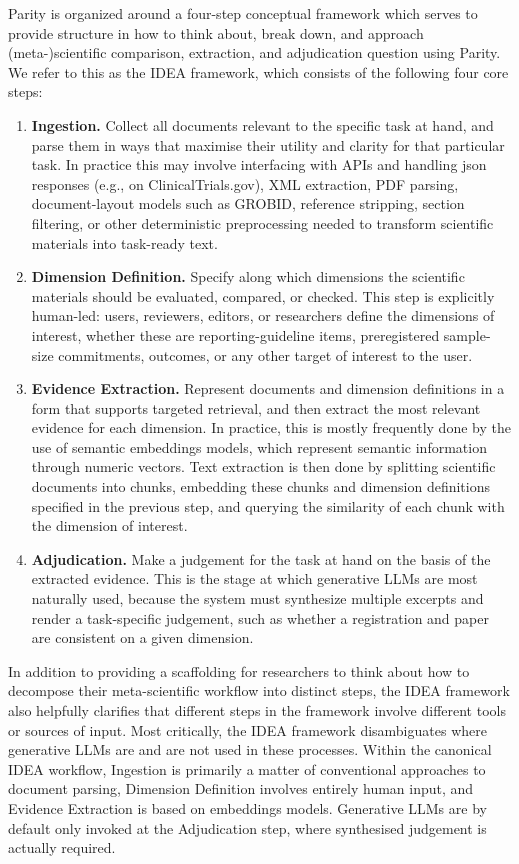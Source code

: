 \documentclass{article}
\begin{document}
Parity is organized around a four-step conceptual framework which serves to provide structure in how to think about, break down, and approach (meta-)scientific comparison, extraction, and adjudication question using Parity. We refer to this as the IDEA framework, which consists of the following four core steps:
\begin{enumerate}
\item \textbf{Ingestion.} Collect all documents relevant to the specific task at hand, and parse them in ways that maximise their utility and clarity for that particular task. In practice this may involve interfacing with APIs and handling json responses (e.g., on ClinicalTrials.gov), XML extraction, PDF parsing, document-layout models such as GROBID, reference stripping, section filtering, or other deterministic preprocessing needed to transform scientific materials into task-ready text.
\item \textbf{Dimension Definition.} Specify along which dimensions the scientific materials should be evaluated, compared, or checked. This step is explicitly human-led: users, reviewers, editors, or researchers define the dimensions of interest, whether these are reporting-guideline items, preregistered sample-size commitments, outcomes, or any other target of interest to the user.
\item \textbf{Evidence Extraction.} Represent documents and dimension definitions in a form that supports targeted retrieval, and then extract the most relevant evidence for each dimension. In practice, this is mostly frequently done by the use of semantic embeddings models, which represent semantic information through numeric vectors. Text extraction is then done by splitting scientific documents into chunks, embedding these chunks and dimension definitions specified in the previous step, and querying the similarity of each chunk with the dimension of interest.
\item \textbf{Adjudication.} Make a judgement for the task at hand on the basis of the extracted evidence. This is the stage at which generative LLMs are most naturally used, because the system must synthesize multiple excerpts and render a task-specific judgement, such as whether a registration and paper are consistent on a given dimension.
\end{enumerate}

In addition to providing a scaffolding for researchers to think about how to decompose their meta-scientific workflow into distinct steps, the IDEA framework also helpfully clarifies that different steps in the framework involve different tools or sources of input. Most critically, the IDEA framework disambiguates where generative LLMs are and are not used in these processes. Within the canonical IDEA workflow, Ingestion is primarily a matter of conventional approaches to document parsing, Dimension Definition involves entirely human input, and Evidence Extraction is based on embeddings models. Generative LLMs are by default only invoked at the Adjudication step, where synthesised judgement is actually required. 
\end{document}
